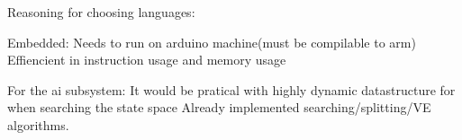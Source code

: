 Reasoning for choosing languages:

Embedded:
  Needs to run on arduino machine(must be compilable to arm)
  Effiencient in instruction usage and memory usage

For the ai subsystem:
  It would be pratical with highly dynamic datastructure for when searching the state space
  Already implemented searching/splitting/VE algorithms.
